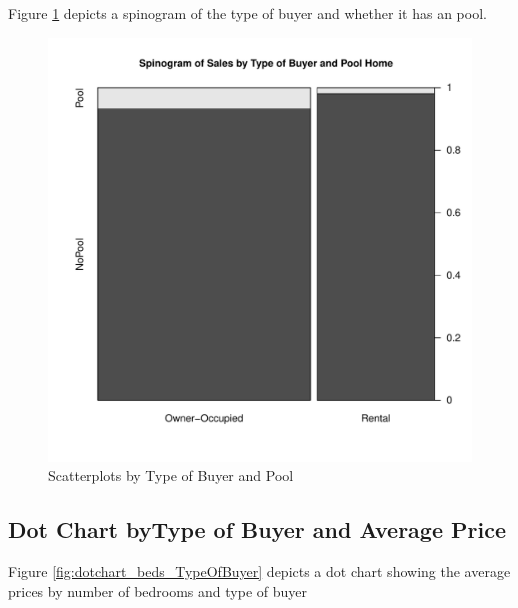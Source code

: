 \pagebreak

Figure \ref{fig:buyer_and_pool_sales} depicts a spinogram
of the type of buyer and whether it has an pool.

\begin{figure}[h!]
  \centering
  \includegraphics[scale = 0.5, keepaspectratio=true]{../Figures/buyer_and_pool_sales}
  \caption{Scatterplots by Type of Buyer and Pool} \label{fig:buyer_and_pool_sales}
\end{figure}

\pagebreak
\subsection*{Dot Chart byType of Buyer and Average Price}

Figure \ref{fig:dotchart_beds_TypeOfBuyer} depicts a dot chart
showing the average prices by number of bedrooms and type of buyer



